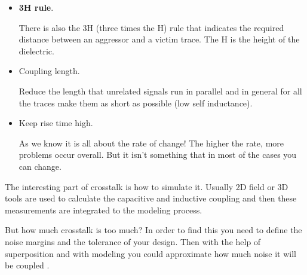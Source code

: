 \documentclass[final]{cubedoc}
\begin{document}
\begin{itemize}
		\item \textbf{3H rule}.
		
		There is also the 3H (three times the H) rule that indicates the required distance between an aggressor and a victim trace. The H is the height of the dielectric.
		
		\item Coupling length.
		
		Reduce the length that unrelated signals run in parallel and in general for all the traces make them as short as possible (low self inductance).
		
		\item Keep rise time high.
		
		As we know it is all about the rate of change! The higher the rate, more problems occur overall. But it isn't something that in most of the cases you can change.
	\end{itemize}
	
	The interesting part of crosstalk is how to simulate it. Usually 2D field or 3D tools are used to calculate the capacitive and inductive coupling and then these measurements are integrated to the modeling process. 
	
	But how much crosstalk is too much? In order to find this you need to define the noise margins and the tolerance of your design. Then with the help of superposition and with modeling you could approximate how much noise it will be coupled \cite{montrose2004emc,bogatin2009signal}.
	
	
	
\end{document}
